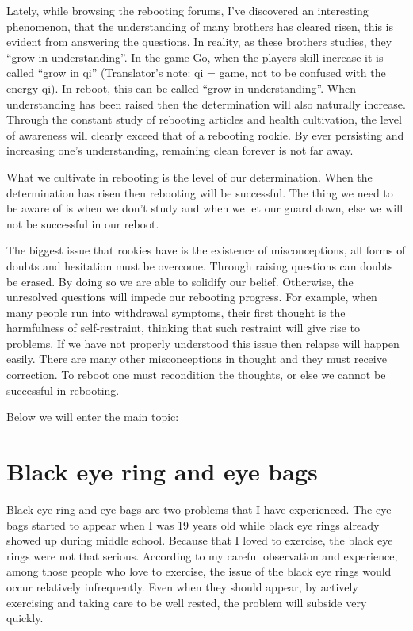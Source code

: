 \documentclass[
]{book}
\begin{document}
Lately, while browsing the rebooting forums, I've discovered an interesting phenomenon, that the understanding of many brothers has cleared risen, this is evident from answering the questions. In reality, as these brothers studies, they ``grow in understanding''. In the game Go, when the players skill increase it is called ``grow in qi'' (Translator's note: qi = game, not to be confused with the energy qi). In reboot, this can be called ``grow in understanding''. When understanding has been raised then the determination will also naturally increase. Through the constant study of rebooting articles and health cultivation, the level of awareness will clearly exceed that of a rebooting rookie. By ever persisting and increasing one's understanding, remaining clean forever is not far away.

What we cultivate in rebooting is the level of our determination. When the determination has risen then rebooting will be successful. The thing we need to be aware of is when we don't study and when we let our guard down, else we will not be successful in our reboot.

The biggest issue that rookies have is the existence of misconceptions, all forms of doubts and hesitation must be overcome. Through raising questions can doubts be erased. By doing so we are able to solidify our belief. Otherwise, the unresolved questions will impede our rebooting progress. For example, when many people run into withdrawal symptoms, their first thought is the harmfulness of self-restraint, thinking that such restraint will give rise to problems. If we have not properly understood this issue then relapse will happen easily. There are many other misconceptions in thought and they must receive correction. To reboot one must recondition the thoughts, or else we cannot be successful in rebooting.

Below we will enter the main topic:

\hypertarget{black-eye-ring-and-eye-bags}{%
\section{Black eye ring and eye bags}\label{black-eye-ring-and-eye-bags}}

Black eye ring and eye bags are two problems that I have experienced. The eye bags started to appear when I was 19 years old while black eye rings already showed up during middle school. Because that I loved to exercise, the black eye rings were not that serious. According to my careful observation and experience, among those people who love to exercise, the issue of the black eye rings would occur relatively infrequently. Even when they should appear, by actively exercising and taking care to be well rested, the problem will subside very quickly.
\end{document}
